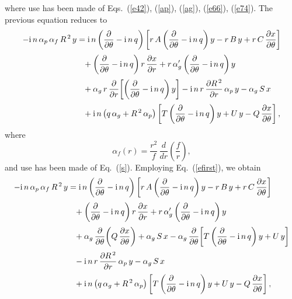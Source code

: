 \documentclass[12pt,prb,aps]{revtex4-1}
\begin{document}
where use has been made of Eqs.~(\ref{e42}), (\ref{ap}), (\ref{ag}), (\ref{e66}),  (\ref{e74}). The
previous equation reduces to
\begin{align}
-{\rm i}\,n\,\alpha_p\,\alpha_f\,R^{\,2}\,y&={\rm i}\,n\left(\frac{\partial}{\partial\theta}-{\rm i}\,n\,q\right)\left[r\,A\left(\frac{\partial}{\partial \theta}-{\rm i}\,n\,q\right)y-r\,B\,y+r\,C\,\frac{\partial x}{\partial\theta}\right]\nonumber\\[0.5ex]&\phantom= +\left(\frac{\partial}{\partial\theta}-{\rm i}\,n\,q\right)r\,\frac{\partial x}{\partial r}  +r\,\alpha_g'\left(\frac{\partial}{\partial\theta}-{\rm i}\,n\,q\right)y \nonumber\\[0.5ex]
&\phantom{=}+ \alpha_g\,r\,\frac{\partial}{\partial r}\!\left[\left(\frac{\partial}{\partial\theta}-{\rm i}\,n\,q\right)y\right]
-{\rm i}\,n\,r\,\frac{\partial R^{\,2}}{\partial r}\,\alpha_p\,y-\alpha_g\,S\,x\nonumber\\[0.5ex]
&\phantom{=} +{\rm i}\,n\left(q\,\alpha_g + R^{\,2}\,\alpha_p\right) \left[T\left(\frac{\partial}{\partial\theta}-{\rm i}\,n\,q\right)y + U\,y -Q\,\frac{\partial x}{\partial\theta}\right],
\end{align}
where
\begin{equation}\label{af}
\alpha_f(r) = \frac{r^2}{f}\,\frac{d}{dr}\!\left(\frac{f}{r}\right),
\end{equation}
and use has been made of Eq.~(\ref{s}). 
Employing Eq.~(\ref{efirst}), we obtain
\begin{align}
-{\rm i}\,n\,\alpha_p\,\alpha_f\,R^{\,2}\,y&={\rm i}\,n\left(\frac{\partial}{\partial\theta}-{\rm i}\,n\,q\right)\left[r\,A\left(\frac{\partial}{\partial \theta}-{\rm i}\,n\,q\right)y-r\,B\,y+r\,C\,\frac{\partial x}{\partial\theta}\right]\nonumber\\[0.5ex]&\phantom= +\left(\frac{\partial}{\partial\theta}-{\rm i}\,n\,q\right)r\,\frac{\partial x}{\partial r}  +r\,\alpha_g'\left(\frac{\partial}{\partial\theta}-{\rm i}\,n\,q\right)y \nonumber\\[0.5ex]
&\phantom{=}+ \alpha_g\,\frac{\partial}{\partial\theta}\!\left(Q\,\frac{\partial x}{\partial\theta}\right)
+\alpha_g\,S\,x -\alpha_g\,\frac{\partial}{\partial\theta}\!\left[T\left(\frac{\partial}{\partial\theta}-{\rm i}\,n\,q\right)y+U\,y\right]\nonumber\\[0.5ex]&\phantom{=}
-{\rm i}\,n\,r\,\frac{\partial R^{\,2}}{\partial r}\,\alpha_p\,y-\alpha_g\,S\,x\nonumber\\[0.5ex]
&\phantom{=} +{\rm i}\,n\left(q\,\alpha_g + R^{\,2}\,\alpha_p\right) \left[T\left(\frac{\partial}{\partial\theta}-{\rm i}\,n\,q\right)y + U\,y -Q\,\frac{\partial x}{\partial\theta}\right],
\end{align}
\end{document}
